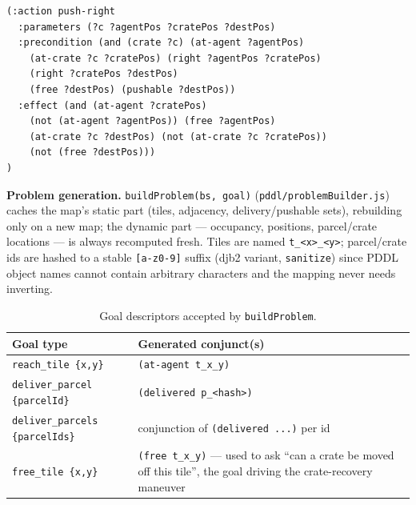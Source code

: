 \documentclass[11pt,a4paper]{article}
\renewcommand{\paragraph}[1]{\par\smallskip\noindent\textbf{#1}}
\begin{document}
\begin{minipage}{\linewidth}
\begin{lstlisting}[language={},caption={Push action (excerpt, \texttt{pddl/domain.pddl}): the
agent and the crate must be co-linear in the push direction, and the destination must be both
\texttt{free} and \texttt{pushable}.},label={lst:pddl-push}]
(:action push-right
  :parameters (?c ?agentPos ?cratePos ?destPos)
  :precondition (and (crate ?c) (at-agent ?agentPos)
    (at-crate ?c ?cratePos) (right ?agentPos ?cratePos)
    (right ?cratePos ?destPos)
    (free ?destPos) (pushable ?destPos))
  :effect (and (at-agent ?cratePos)
    (not (at-agent ?agentPos)) (free ?agentPos)
    (at-crate ?c ?destPos) (not (at-crate ?c ?cratePos))
    (not (free ?destPos)))
)
\end{lstlisting}
\end{minipage}

\paragraph{Problem generation.} \texttt{buildProblem(bs, goal)} (\texttt{pddl/problemBuilder.js})
caches the map's static part (tiles, adjacency, delivery/pushable sets), rebuilding only on a new
map; the dynamic part --- occupancy, positions, parcel/crate locations --- is always recomputed
fresh. Tiles are named \texttt{t\_\textless x\textgreater\_\textless y\textgreater}; parcel/crate
ids are hashed to a stable \texttt{[a-z0-9]} suffix (djb2 variant, \texttt{sanitize}) since PDDL
object names cannot contain arbitrary characters and the mapping never needs inverting.

\begin{table}[htbp]
\centering
\footnotesize
\begin{tabular}{@{}p{3.4cm}p{8.6cm}@{}}
\toprule
\textbf{Goal type} & \textbf{Generated conjunct(s)} \\
\midrule
\texttt{reach\_tile \{x,y\}} & \texttt{(at-agent t\_x\_y)} \\
\texttt{deliver\_parcel \{parcelId\}} & \texttt{(delivered p\_\textless hash\textgreater)} \\
\texttt{deliver\_parcels \{parcelIds\}} & conjunction of \texttt{(delivered ...)} per id \\
\texttt{free\_tile \{x,y\}} & \texttt{(free t\_x\_y)} --- used to ask ``can a crate be moved off this tile'', the goal driving the crate-recovery maneuver \\
\bottomrule
\end{tabular}
\caption{Goal descriptors accepted by \texttt{buildProblem}.}
\label{tab:pddl-goals}
\end{table}
\end{document}
